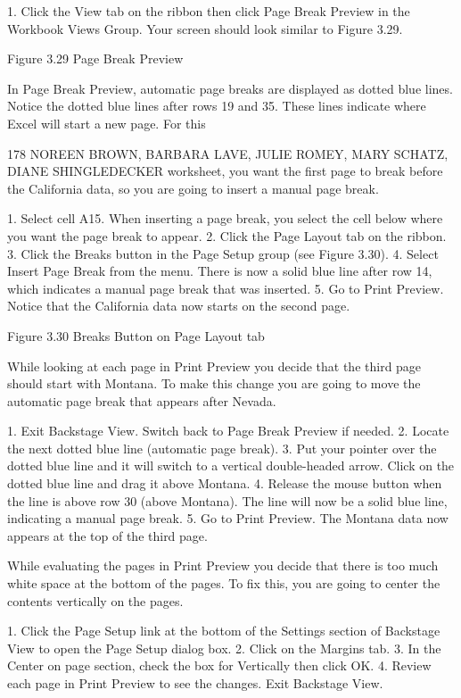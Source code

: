 1. Click the View tab on the ribbon then click Page Break Preview in the Workbook Views Group.
Your screen should look similar to Figure 3.29.




Figure 3.29 Page Break Preview


In Page Break Preview, automatic page breaks are displayed as dotted blue lines. Notice the dotted
blue lines after rows 19 and 35. These lines indicate where Excel will start a new page. For this


178 NOREEN BROWN, BARBARA LAVE, JULIE ROMEY, MARY SCHATZ, DIANE SHINGLEDECKER
worksheet, you want the first page to break before the California data, so you are going to insert a
manual page break.

1. Select cell A15. When inserting a page break, you select the cell below where you want the page
break to appear.
2. Click the Page Layout tab on the ribbon.
3. Click the Breaks button in the Page Setup group (see Figure 3.30).
4. Select Insert Page Break from the menu. There is now a solid blue line after row 14, which
indicates a manual page break that was inserted.
5. Go to Print Preview. Notice that the California data now starts on the second page.




Figure 3.30 Breaks Button on Page Layout tab


While looking at each page in Print Preview you decide that the third page should start with Montana.
To make this change you are going to move the automatic page break that appears after Nevada.

1. Exit Backstage View. Switch back to Page Break Preview if needed.
2. Locate the next dotted blue line (automatic page break).
3. Put your pointer over the dotted blue line and it will switch to a vertical double-headed arrow.
Click on the dotted blue line and drag it above Montana.
4. Release the mouse button when the line is above row 30 (above Montana). The line will now be a
solid blue line, indicating a manual page break.
5. Go to Print Preview. The Montana data now appears at the top of the third page.

While evaluating the pages in Print Preview you decide that there is too much white space at the
bottom of the pages. To fix this, you are going to center the contents vertically on the pages.

1. Click the Page Setup link at the bottom of the Settings section of Backstage View to open the
Page Setup dialog box.
2. Click on the Margins tab.
3. In the Center on page section, check the box for Vertically then click OK.
4. Review each page in Print Preview to see the changes. Exit Backstage View.


